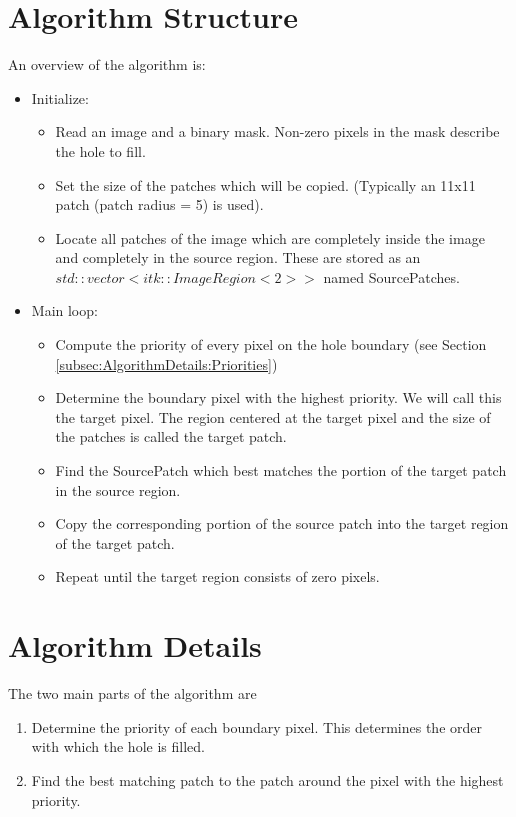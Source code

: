 \documentclass{InsightArticle}
\begin{document}
\section{Algorithm Structure}
An overview of the algorithm is:
\begin{itemize}
  \item Initialize:
    \begin{itemize}
      \item Read an image and a binary mask. Non-zero pixels in the mask describe the hole to fill.
      \item Set the size of the patches which will be copied. (Typically an 11x11 patch (patch radius = 5) is used).
      \item Locate all patches of the image which are completely inside the image and completely in the source region. These are stored as an $std::vector<itk::ImageRegion<2> >$ named SourcePatches.
    \end{itemize}

  \item Main loop:
  \begin{itemize}
    \item Compute the priority of every pixel on the hole boundary (see Section \ref{subsec:AlgorithmDetails:Priorities})
    \item Determine the boundary pixel with the highest priority. We will call this the target pixel. The region centered at the target pixel and the size of the patches is called the target patch.
    \item Find the SourcePatch which best matches the portion of the target patch in the source region.
    \item Copy the corresponding portion of the source patch into the target region of the target patch.
    \item Repeat until the target region consists of zero pixels.
  \end{itemize}
\end{itemize}

\section{Algorithm Details}
\label{sec:AlgorithmDetails}

The two main parts of the algorithm are
\begin{enumerate}
 \item Determine the priority of each boundary pixel. This determines the order with which the hole is filled.
 \item Find the best matching patch to the patch around the pixel with the highest priority.
\end{enumerate}
\end{document}
